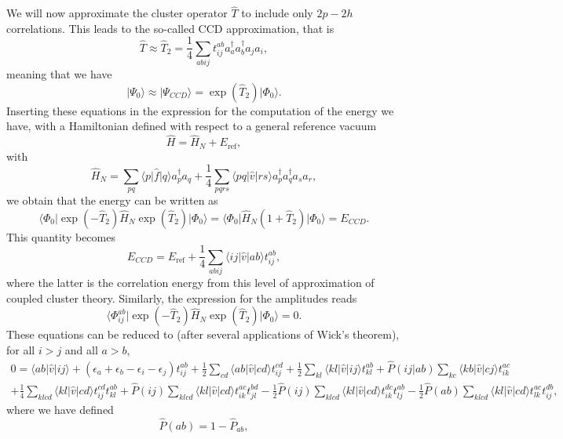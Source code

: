 \documentclass[%
oneside,                 %
final,                   %
10pt]{article}
\begin{document}
  We will now approximate the cluster operator $\hat{T}$ to include
  only $2p-2h$ correlations. This leads to the so-called CCD
  approximation, that is
  \[
  \hat{T}\approx
  \hat{T}_2=\frac{1}{4}\sum_{abij}t_{ij}^{ab}a^{\dagger}_aa^{\dagger}_ba_ja_i,
  \]
  meaning that we have
  \[
  \vert \Psi_0 \rangle \approx \vert \Psi_{CCD} \rangle =
  \exp{\left(\hat{T}_2\right)}\vert \Phi_0\rangle.
  \]
  Inserting these equations in the expression for the computation of
  the energy we have, with a Hamiltonian defined with respect to a
  general reference vacuum
  \[
  \hat{H}=\hat{H}_N+E_{\mathrm{ref}},
  \]
  with
  \[
  \hat{H}_N=\sum_{pq}\langle p \vert \hat{f} \vert q \rangle
  a^{\dagger}_pa_q + \frac{1}{4}\sum_{pqrs}\langle pq \vert \hat{v}
  \vert rs \rangle a^{\dagger}_pa^{\dagger}_qa_sa_r,
  \]
  we obtain that the energy can be written as
  \[
  \langle \Phi_0 \vert
  \exp{\left(-\hat{T}_2\right)}\hat{H}_N\exp{\left(\hat{T}_2\right)}\vert
  \Phi_0\rangle = \langle \Phi_0 \vert \hat{H}_N(1+\hat{T}_2)\vert
  \Phi_0\rangle = E_{CCD}.
  \]
  This quantity becomes
  \[
  E_{CCD}=E_{\mathrm{ref}}+\frac{1}{4}\sum_{abij}\langle ij \vert
  \hat{v} \vert ab \rangle t_{ij}^{ab},
  \]
  where the latter is the correlation energy from this level of
  approximation of coupled cluster  theory.  Similarly, the expression for the
  amplitudes reads
  \[
  \langle \Phi_{ij}^{ab} \vert
  \exp{\left(-\hat{T}_2\right)}\hat{H}_N\exp{\left(\hat{T}_2\right)}\vert
  \Phi_0\rangle = 0.
  \]
  These equations can be reduced to (after several applications of
  Wick's theorem), for all $i > j$ and all $a > b$,
  \begin{align}
  0 = \langle ab \vert \hat{v} \vert ij \rangle +
  \left(\epsilon_a+\epsilon_b-\epsilon_i-\epsilon_j\right)t_{ij}^{ab}+\frac{1}{2}\sum_{cd} \langle ab \vert \hat{v} \vert
  cd \rangle t_{ij}^{cd}+\frac{1}{2}\sum_{kl} \langle kl \vert \hat{v}
  \vert ij \rangle t_{kl}^{ab}+\hat{P}(ij\vert ab)\sum_{kc} \langle kb
  \vert \hat{v} \vert cj \rangle t_{ik}^{ac} & \nonumber
  \\ +\frac{1}{4}\sum_{klcd} \langle kl \vert \hat{v} \vert cd \rangle
  t_{ij}^{cd}t_{kl}^{ab}+\hat{P}(ij)\sum_{klcd} \langle kl \vert
  \hat{v} \vert cd \rangle t_{ik}^{ac}t_{jl}^{bd}-\frac{1}{2}\hat{P}(ij)\sum_{klcd} \langle kl \vert \hat{v} \vert
  cd \rangle t_{ik}^{dc}t_{lj}^{ab}-\frac{1}{2}\hat{P}(ab)\sum_{klcd}
  \langle kl \vert \hat{v} \vert cd \rangle t_{lk}^{ac}t_{ij}^{db},&
  \label{eq:ccd}
  \end{align}
  where we have defined
  \[
  \hat{P}\left(ab\right)= 1-\hat{P}_{ab},
  \]
\end{document}
